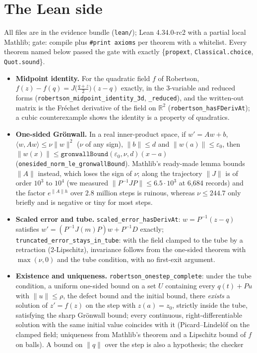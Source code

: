 \documentclass[11pt]{article}
\newcommand{\nrm}[1]{\lVert #1\rVert}
\newcommand{\ip}[2]{\langle #1,#2\rangle}
\begin{document}
\section{The Lean side}
All files are in the evidence bundle (\texttt{lean/}); Lean 4.34.0-rc2 with a partial local Mathlib; gate:
compile plus \texttt{\#print axioms} per theorem with a whitelist. Every theorem named below passed the gate with exactly
\{\texttt{propext}, \texttt{Classical.choice}, \texttt{Quot.sound}\}.
\begin{itemize}\itemsep1pt
\item \textbf{Midpoint identity.} For the quadratic field $f$ of Robertson, $f(z)-f(q)=J\!\big(\tfrac{q+z}2\big)(z-q)$ exactly, in the 3-variable and
reduced forms (\texttt{robertson\_midpoint\_identity\_3d}, \texttt{\_reduced}), and the written-out matrix is the Fr\'echet derivative of the field on
$\mathbb{R}^2$ (\texttt{robertson\_hasFDerivAt}); a cubic counterexample shows the identity is a property of quadratics.
\item \textbf{One-sided Gr\"onwall.} In a real inner-product space, if $w'=Aw+b$, $\ip{w}{Aw}\le\nu\nrm{w}^2$ ($\nu$ of any sign), $\nrm{b}\le d$
and $\nrm{w(a)}\le\varepsilon_0$, then $\nrm{w(x)}\le\texttt{gronwallBound}(\varepsilon_0,\nu,d)(x-a)$
(\texttt{onesided\_norm\_le\_gronwallBound}). Mathlib's ready-made lemma bounds $\nrm{A}$ instead, which loses the sign of $\nu$; along the trajectory $\nrm{J}$ is of order $10^3$ to $10^4$ (we measured $\nrm{P^{-1}JP}\le6.5\cdot10^3$ at 6{,}684 records) and the factor $e^{\nrm{A}h}$ over $2.8$ million steps is ruinous, whereas $\nu\le244.7$ only briefly and is negative or tiny for most steps.
\item \textbf{Scaled error and tube.} \texttt{scaled\_error\_hasDerivAt}: $w=P^{-1}(z-q)$ satisfies $w'=(P^{-1}J(m)P)w+P^{-1}D$ exactly;
\texttt{truncated\_error\_stays\_in\_tube}: with the field clamped to the tube by a retraction (2-Lipschitz), invariance follows from the
one-sided theorem with $\max(\nu,0)$ and the tube condition, with no first-exit argument.
\item \textbf{Existence and uniqueness.} \texttt{robertson\_onestep\_complete}: under the tube condition, a uniform one-sided bound on a set
$U$ containing every $q(t)+Pu$ with $\nrm{u}\le\rho$, the defect bound and the initial bound, there \emph{exists} a solution of $z'=f(z)$ on the
step with $z(a)=z_0$, strictly inside the tube, satisfying the sharp Gr\"onwall bound; every continuous, right-differentiable solution with the same initial
value coincides with it (Picard--Lindel\"of on the clamped field; uniqueness from Mathlib's theorem and a Lipschitz bound of $f$ on balls). A bound on $\nrm{q}$ over the step is also a hypothesis; the checker

\end{itemize}
\end{document}
